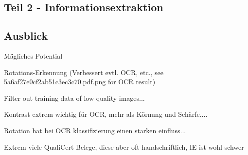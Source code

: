 
\subsection{Teil 2 - Informationsextraktion}



\subsection{Ausblick}

Mägliches Potential

Rotations-Erkennung (Verbessert evtl. OCR, etc., see 5a6af27e0cf2ab51c3ec3c70.pdf.png for OCR result)

Filter out training data of low quality images...

Kontrast extrem wichtig für OCR, mehr als Körnung und Schärfe....

Rotation hat bei OCR klassifizierung einen starken einfluss...

Extrem viele QualiCert Belege, diese aber oft handschriftlich, IE ist wohl schwer
